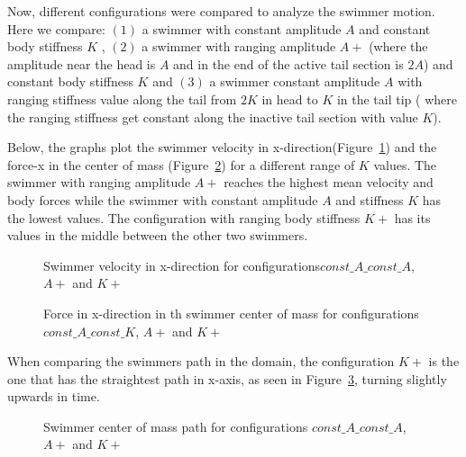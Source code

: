 Now, different configurations were compared to analyze the swimmer motion. Here we compare: $(1)$ a swimmer with constant amplitude $A$ and constant body stiffness $K$ , $(2)$
a swimmer with ranging amplitude $A+$ (where the amplitude near the head is $A$ and in the end of the active tail section is $2A$) and constant body stiffness $K$ and 
$(3)$ a swimmer constant amplitude $A$ with ranging stiffness value along the tail from $2K$ in head to $K$ in the tail tip ( where the ranging stiffness get constant along 
the inactive tail section with value $K$).\par
Below, the graphs plot the swimmer velocity in x-direction(Figure~\ref{fig:Bild4.21}) and the force-x in the center of mass (Figure~\ref{fig:Bild4.22}) for a different range of $K$ values.
The swimmer with ranging amplitude $A+$ reaches the highest mean velocity and body forces while the swimmer with constant amplitude $A$ and stiffness $K$ has the lowest values.
The configuration with ranging body stiffness $K+$ has its values in the middle between the other two swimmers.


\begin{figure}[H]
\centering
  \begin{footnotesize}
  
  \caption[Swimmer velocity in x-direction for configurations $const\_A\_const\_A$, $A+$ and $K+$ ]{Swimmer velocity in x-direction for configurations$const\_A\_const\_A$, $A+$ and $K+$ }
   \label{fig:Bild4.21}
  \end{footnotesize}
\end{figure}

\begin{figure}[H]
\centering
  \begin{footnotesize}
  
  \caption[Force in x-direction in th swimmer center of mass for configurations $const\_A\_const\_K$ and $K+$]{Force in x-direction in th swimmer center of mass for configurations $const\_A\_const\_K$, $A+$ and $K+$}
   \label{fig:Bild4.22}
  \end{footnotesize}
\end{figure}

When comparing the swimmers path in the domain, the configuration $K+$ is the one that has the straightest path in x-axis, as seen in Figure~\ref{fig:Bild4.23}, turning slightly
upwards in time.


\begin{figure}[H]
\centering
  \begin{footnotesize}
  
  \caption[Swimmer center of mass path for configurations$const\_A\_const\_K$, $A+$ and $K+$]{Swimmer center of mass path for configurations $const\_A\_const\_A$, $A+$ and $K+$}
   \label{fig:Bild4.23}
  \end{footnotesize}
\end{figure}


